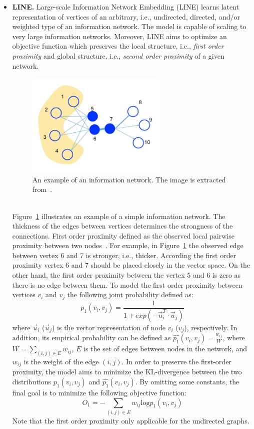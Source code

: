 \begin{itemize}
\item \textbf{LINE.}
Large-scale Information Network Embedding (LINE) learns latent representation of vertices of an arbitrary, i.e., undirected, directed, and/or weighted type of an information network. The model is capable of scaling to very large information networks. Moreover, LINE aims to optimize an objective function which preserves the local structure, i.e., \textit{first order proximity} and global structure, i.e., \textit{second order proximity} of a given network. 
\begin{figure}[h]
\centering
 \includegraphics[height=5cm]{Figures/fig_LINE.png}
 \caption{An example of an information network. The image is extracted from~\cite{LINE}.}
 \label{fig:LINE}
\end{figure} \\
Figure~\ref{fig:LINE} illustrates an example of a simple information network. The thickness of the edges between vertices determines the strongness of the connections. 
First order proximity defined as the observed local pairwise proximity between two nodes~\cite{DBLP:journals/tkde/CuiWPZ19}. For example, in Figure~\ref{fig:LINE} the observed edge between vertex 6 and 7 is stronger, i.e., thicker. According the first order proximity vertex 6 and 7 should be placed closely in the vector space. On the other hand, the first order proximity between the vertex 5 and 6 is zero as there is no edge between them.
To model the first order proximity between vertices $v_i$ and $v_j$ the following joint probability defined as:
\begin{equation} \label{eq:jointProb}
p_{1}(v_{i},v_{j})=\frac{1}{1+exp(-\vec{u}_{i}^{T}\cdot\vec{u}_{j})}
\end{equation}
where $\vec{u}_{i}$ ($\vec{u}_{j}$) is the vector representation of node $v_i$ ($v_j$), respectively. In addition, its empirical probability can be defined as $\hat{p_1}(v_i,v_j)=\frac{w_{ij}}{W}$, where $W=\sum_{(i,j) \in E}w_{ij}$, $E$ is the set of edges between nodes in the network, and $w_{ij}$ is the weight of the edge $(i,j)$.
In order to preserve the first-order proximity, the model aims to minimize the KL-divergence between the two distributions $p_{1}(v_{i},v_{j})$ and $\hat{p_1}(v_i,v_j)$. By omitting some constants, the final goal is to minimize the following objective function:
\begin{equation}
O_{1}=-\sum_{(i,j) \in E}w_{ij} \textrm{log}p_{1}(v_{i},v_{j})
\end{equation}
Note that the first order proximity only applicable for the undirected graphs.


\end{itemize}
